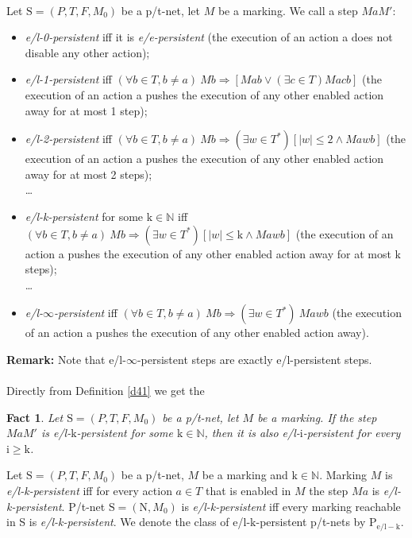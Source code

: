\documentclass[a4paper]{llncs}
\newtheorem{fact}{Fact}
\begin{document}
\begin{definition}
\label{d41}\\
Let $\mathrm{S}=(P,T,F,M_0)$ be a p/t-net, let $M$ be a marking.
We call a step $MaM'$:

\begin{itemize}
\item \emph{e/l-0-persistent} iff it is \emph{e/e-persistent} (the execution of an action a does not disable any other action);
\item \emph{e/l-1-persistent} iff $(\forall b\in T, b\neq a) \ Mb \Rightarrow [Mab \lor (\exists c \in T) Macb]$ (the execution of an action a pushes the execution of any other enabled action away for at most 1 step);
\item \emph{e/l-2-persistent} iff $(\forall b\in T, b\neq a) \ Mb \Rightarrow (\exists w \in T^*) [|w|\leq 2 \land Mawb]$ (the execution of an action a pushes the execution of any other enabled action away for at most 2 steps);
\\
\indent\ldots

\item \emph{e/l-k-persistent} for some $\mathrm{k} \in \mathbb{N}$ iff $(\forall b\in T, b\neq a) \ Mb \Rightarrow (\exists w \in T^*) [{|w|\leq \mathrm{k}} \land Mawb]$ (the execution of an action a pushes the execution of any other enabled action away for at most $\mathrm{k}$ steps);
\\
\indent\ldots
\item \emph{e/l-$\infty$-persistent} iff $(\forall b\in T, b\neq a) \ Mb \Rightarrow (\exists w \in T^*) \ Mawb$ (the execution of an action a pushes the execution of any other enabled action away).
\end{itemize}
\end{definition}

\textbf{Remark:} Note that e/l-$\infty$-persistent steps are exactly e/l-persistent steps.
\\ \\
Directly from Definition \ref{d41} we get the
\begin{fact}
\label{f42}
Let $\mathrm{S}=(P,T,F,M_0)$ be a p/t-net, let $M$ be a marking. If the step $MaM'$ is e/l-$\mathrm{k}$-persistent for some $\mathrm{k} \in \mathbb{N}$, then it is also e/l-$\mathrm{i}$-persistent for every $\mathrm{i}\geq \mathrm{k}$.
\end{fact}

\begin{definition}
\label{d43}
Let $\mathrm{S}=(P,T,F,M_0)$ be a p/t-net, $M$ be a marking and $\mathrm{k}\in \mathbb{N}$.
Marking $M$ is \emph{e/l-k-persistent} iff for every action $a \in T$ that is enabled in $M$ the step $Ma$ is \emph{e/l-k-persistent}.
P/t-net $\mathrm{S}=(\mathrm{N},M_0)$ is \emph{e/l-k-persistent} iff every marking reachable in S is \emph{e/l-k-persistent}.
We denote the class of e/l-$\mathrm{k}$-persistent p/t-nets by $\mathrm{P}_{\mathrm{e/l-k}}$.
\end{definition}
\end{document}
